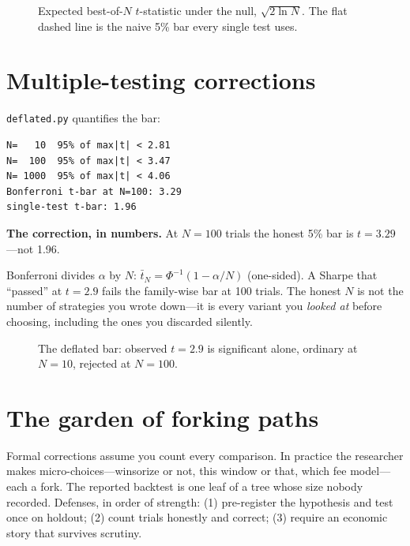 \begin{figure}[htbp]\centering

\caption{Expected best-of-$N$ $t$-statistic under the null, $\sqrt{2\ln N}$. The flat
dashed line is the naive 5\% bar every single test uses.}
\label{fig:bestn}
\end{figure}

\section{Multiple-testing corrections}\label{sec:mtcorr}

\texttt{deflated.py} quantifies the bar:
\begin{lstlisting}[numbers=none]
N=   10  95% of max|t| < 2.81
N=  100  95% of max|t| < 3.47
N= 1000  95% of max|t| < 4.06
Bonferroni t-bar at N=100: 3.29
single-test t-bar: 1.96
\end{lstlisting}

\begin{example}\label{ex:bonf}
\textbf{The correction, in numbers.} At $N{=}100$ trials the honest 5\% bar is
$t=3.29$---not 1.96.
\begin{solution}
Bonferroni divides $\alpha$ by $N$: $\bar t_N=\Phi^{-1}(1-\alpha/N)$ (one-sided). A Sharpe that
``passed'' at $t=2.9$ fails the family-wise bar at 100 trials. The honest $N$ is not the
number of strategies you wrote down---it is every variant you \emph{looked at} before
choosing, including the ones you discarded silently.
\end{solution}
\end{example}

\begin{figure}[htbp]\centering

\caption{The deflated bar: observed $t=2.9$ is significant alone, ordinary at $N{=}10$,
rejected at $N{=}100$.}
\label{fig:deflated}
\end{figure}

\section{The garden of forking paths}\label{sec:forking}

Formal corrections assume you count every comparison. In practice the researcher makes
micro-choices---winsorize or not, this window or that, which fee model---each a fork. The
reported backtest is one leaf of a tree whose size nobody recorded. Defenses, in order of
strength: (1) pre-register the hypothesis and test once on holdout; (2) count trials
honestly and correct; (3) require an economic story that survives scrutiny.

